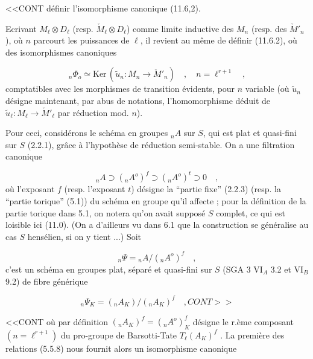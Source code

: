 
<<CONT définir l'isomorphisme canonique (11.6,2).

Ecrivant $M_\ell \otimes D_\ell$ (resp. $\check{M}_\ell \otimes D_\ell$) comme limite inductive des $M_n$ (resp. des $\check{M}'_n$), où $n$ parcourt les puissances de $\ell$, il revient au même de définir (11.6.2), où des isomorphismes canoniques

\begin{equation}\tag{11.6.4}
{}_n\Phi_o \simeq \mathrm{Ker}\,(\tilde{u}_n : M_n \longrightarrow \check{M}'_n) \quad , \quad n = \ell^{r+1} \quad ,
\end{equation}
comptatibles avec les morphismes de transition évidents, pour $n$ variable (où $\tilde{u}_n$ désigne maintenant, par abus de notations, l'homomorphisme déduit de $\tilde{u}_\ell : M_\ell \longrightarrow \check{M}'_\ell$ par réduction mod. $n$).

Pour ceci, considérons le schéma en groupes ${}_nA$ sur $S$, qui est plat et quasi-fini sur $S$ (2.2.1), grâce à l'hypothèse de réduction semi-stable. On a une filtration canonique

\begin{equation}\tag{11.6.5}
{}_nA \supset ({}_nA^o)^f \supset ({}_nA^o)^t \supset 0 \quad ,
\end{equation}
où l'exposant $f$ (resp. l'exposant $t$) désigne la ``partie fixe'' (2.2.3) (resp. la ``partie torique'' (5.1)) du schéma en groupe qu'il affecte ; pour la définition de la partie torique dans 5.1, on notera qu'on avait supposé $S$ complet, ce qui est loisible ici (11.0). (On a d'ailleurs vu dans 6.1 que la construction se généralise au cas $S$ hensélien, si on y tient ...) Soit

\begin{equation}\tag{11.6.6}
{}_n\Psi = {}_nA/({}_nA^o)^f \quad ,
\end{equation}
c'est un schéma en groupes plat, séparé et quasi-fini sur $S$ (SGA 3 $\mathrm{VI}_A$ 3.2 et $\mathrm{VI}_B$ 9.2) de fibre générique

\begin{equation*}
{}_n\Psi_K = ({}_nA_K)/({}_nA_K)^f \quad , CONT>>
\end{equation*}


<<CONT où par définition $({}_nA_K)^f = ({}_nA^o)^f_K$ désigne le r.ème composant $(n=\ell^{r+1})$ du pro-groupe de Barsotti-Tate $T_\ell(A_K)^f$ . La première des relations (5.5.8) nous fournit alors un isomorphisme canonique

